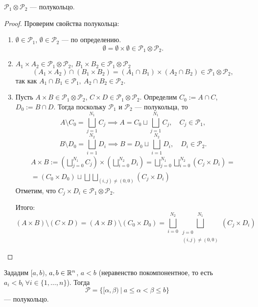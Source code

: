 \begin{theorem}\label{th:1.1}
    $\mathcal{P}_1 \otimes \mathcal{P}_2$ — полукольцо.
\end{theorem} 
\begin{proof}
    Проверим свойства полукольца:
    \begin{enumerate}
        \item $\emptyset \in \mathcal{P}_1$, $\emptyset \in \mathcal{P}_2$ — по определению.
        \[\emptyset = \emptyset \times \emptyset \in \mathcal{P}_1 \otimes \mathcal{P}_2.\]
        \item $A_1 \times A_2 \in \mathcal{P}_1 \otimes \mathcal{P}_2$, $B_1 \times B_2 \in \mathcal{P}_1 \otimes \mathcal{P}_2$
        \[(A_1 \times A_2) \cap (B_1 \times B_2) = (A_1 \cap B_1) \times (A_2 \cap B_2) \in \mathcal{P}_1 \otimes \mathcal{P}_2,\]
        так как $A_1 \cap B_1 \in \mathcal{P}_1, \ A_2 \cap B_2 \in \mathcal{P}_2$.
        \item Пусть $A \times B \in \mathcal{P}_1 \otimes \mathcal{P}_2$, $C \times D \in \mathcal{P}_1 \otimes \mathcal{P}_2$.
        Определим $C_0 := A \cap C$, $D_0 := B \cap D$. Тогда поскольку $\mathcal{P}_1$ и $\mathcal{P}_2$ — полукольца, то
        \[A \setminus C_0 = \bigsqcup\limits_{j=1}^{N_1} C_j \implies A = C_0 \sqcup \bigsqcup\limits_{j=1}^{N_1} C_j, \quad C_j \in \mathcal{P}_1,\]
        \[B \setminus D_0 = \bigsqcup\limits_{i=1}^{N_2} D_i \implies B = D_0 \sqcup \bigsqcup\limits_{i=1}^{N_2} D_i, \quad D_i \in \mathcal{P}_2.\]
        \begin{multline*}
            A \times B := \left(\bigsqcup_{j=0}^{N_1} C_j\right) \times \left(\bigsqcup_{i=0}^{N_2} D_i\right) = \bigsqcup_{j=0}^{N_1} \bigsqcup_{i=0}^{N_2} (C_j \times D_i) =\\= (C_0 \times D_0) \sqcup \bigsqcup \bigsqcup_{(i,j) \neq (0,0)} (C_j \times D_i)
        \end{multline*}
        Отметим, что $C_j \times D_i \in \mathcal{P}_1 \otimes \mathcal{P}_2$.

        Итого:
        \[(A \times B) \setminus (C \times D) = (A \times B) \setminus (C_0 \times D_0) = \bigsqcup_{i=0}^{N_2} \bigsqcup_{\substack{j=0 \\ (i,j) \neq (0,0)}}^{N_1} (C_j \times D_i)\]
    \end{enumerate}
\end{proof} 

\begin{corollary}
    Зададим $[a,b)$, $a, b \in \mathbb{R}^n$, $a < b$ (неравенство покомпонентное, то есть $a_i < b_i \ \forall i \in \{1, \dots, n\}$). Тогда
    \[\mathcal{P} = \{[\alpha, \beta) \ | \ a \leqslant \alpha < \beta \leqslant b\}\]
    — полукольцо.
\end{corollary}